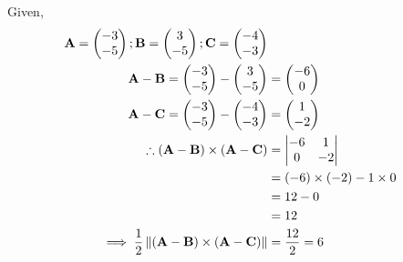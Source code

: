 \solution
Given,
\begin{align}
\vec{A} = \myvec{-3\\-5};
\vec{B} = \myvec{3\\-5};
\vec{C} = \myvec{-4\\-3}\\
\vec{A}-\vec{B}=\myvec{-3\\-5}-\myvec{3\\-5}&=\myvec{-6\\0}\\
\vec{A}-\vec{C}=\myvec{-3\\-5}-\myvec{-4\\-3}&=\myvec{1\\-2}\\
\therefore(\vec{A}-\vec{B})\times(\vec{A}-\vec{C}) &=\mydet{-6 & 1\\0 & -2}\\
	&=(-6)\times (-2)- 1\times0\\&=12-0\\&=12\\
\implies\frac{1}{2}\norm{(\vec{A}-\vec{B})\times(\vec{A}-\vec{C})}&=\frac{12}{2}=6
\end{align}